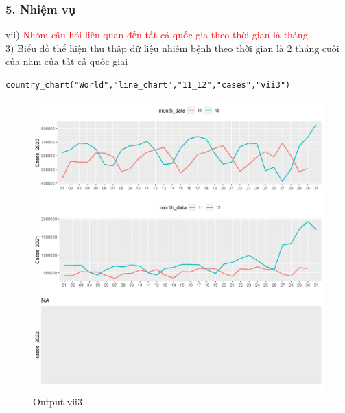 \documentclass[english,10pt,table]{beamer}
\begin{document}
\begin{frame}[fragile]
\frametitle{5.  Nhiệm vụ}
vii) \textcolor{red}{Nhóm câu hỏi liên quan đến tất cả quốc gia theo thời gian là tháng }\\
      3) Biểu đồ thể hiện thu thập dữ liệu nhiễm bệnh theo thời gian là 2 tháng cuối của năm của tất cả quốc giaị
\begin{lstlisting}[frame = single,basicstyle=\tiny]
country_chart("World","line_chart","11_12","cases","vii3")
		\end{lstlisting}
			\begin{figure}[h!]
	\begin{center}
		    \includegraphics[scale = 0.23]{Images/VII/vii3 World .jpeg}
		     \caption{Output vii3}
		\end{center}
		\end{figure}
\end{frame}
\end{document}
